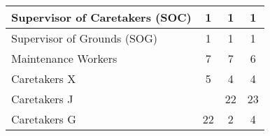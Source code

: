 \begin{tabular}{l|c|c|c|}
        \multicolumn{1}{|l|}{\cellcolor{ccfuschialight}Supervisor of Caretakers (SOC)} & 1                                                      & 1                                                                & 1                                                      \\ \hline
        \multicolumn{1}{|l|}{\cellcolor{ccfuschialight}Supervisor of Grounds (SOG)}    & 1                                                      & 1                                                                & 1                                                      \\ \hline
        \multicolumn{1}{|l|}{\cellcolor{ccfuschialight}Maintenance Workers}            & 7                                                      & 7                                                                & 6                                                       \\ \hline
        \multicolumn{1}{|l|}{\cellcolor{ccfuschialight}Caretakers X}                   & 5                                                      & 4                                                                & 4                                                      \\ \hline
        \multicolumn{1}{|l|}{\cellcolor{ccfuschialight}Caretakers J\tnote{2}}                   &                                                       & 22                                                                & 23                                                        \\ \cline{1-1} \cline{3-4}
        \multicolumn{1}{|l|}{\cellcolor{ccfuschialight}Caretakers G}                   & \multirow{-2}{*}{22}                                                      & 2                                     & 4                            \\ \hline
        \end{tabular}
        
        